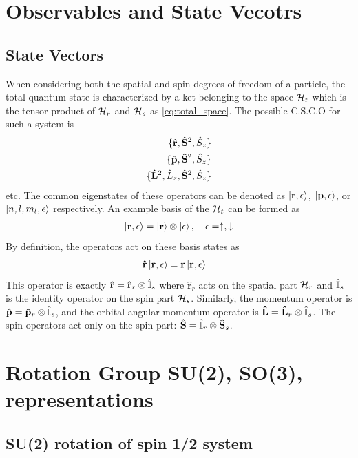\section{Observables and State Vecotrs}
\subsection{State Vectors}
When considering both the spatial and spin degrees of freedom of a particle, the total quantum state is characterized by a ket belonging to the space $\mathcal{H}_t$ which is the tensor product of $\mathcal{H}_r$ and $\mathcal{H}_s$ as \cref{eq:total_space}.
The possible C.S.C.O for such a system is 
\begin{align}
    \{ \hat{\mathbf{r}} , \mathbf{\hat{S}}^2, \hat{S}_z \} \\
    \{ \hat{\mathbf{p}} , \mathbf{\hat{S}}^2, \hat{S}_z \} \\   
    \{ \mathbf{\hat{L}}^2, \hat{L}_z, \mathbf{\hat{S}}^2, \hat{S}_z \}
\end{align}etc.
The common eigenstates of these operators can be denoted as $\ket{\mathbf{r}, \epsilon}$, $\ket{\mathbf{p}, \epsilon}$, or $\ket{n,l,m_l,\epsilon}$ respectively. An example basis of the $\mathcal{H}_t$ can be formed as 
\begin{align}
    \ket{\mathbf{r}, \epsilon} = \ket{\mathbf{r}} \otimes \ket{\epsilon}, \quad \epsilon = \uparrow, \downarrow
\end{align}
By definition, the operators act on these basis states as 
\begin{align*}
    \mathbf{\hat{r}} \ket{\mathbf{r}, \epsilon} & = \mathbf{r} \ket{\mathbf{r}, \epsilon} 
\end{align*}
This operator is exactly $ \mathbf{\hat{r}} = \mathbf{\hat{r}}_r \otimes \hat{\mathbb{I}}_s$ where $\mathbf{\hat{r}}_r$ acts on the spatial part $\mathcal{H}_r$ and $\hat{\mathbb{I}}_s$ is the identity operator on the spin part $\mathcal{H}_s$. Similarly, the momentum operator is $\mathbf{\hat{p}} = \mathbf{\hat{p}}_r \otimes \hat{\mathbb{I}}_s$, and the orbital angular momentum operator is $\mathbf{\hat{L}} = \mathbf{\hat{L}}_r \otimes \hat{\mathbb{I}}_s$. The spin operators act only on the spin part: $\mathbf{\hat{S}} = \hat{\mathbb{I}}_r \otimes \mathbf{\hat{S}}_s$.
\section{Rotation Group SU(2), SO(3), representations }

\subsection{SU(2) rotation of spin 1/2 system}

